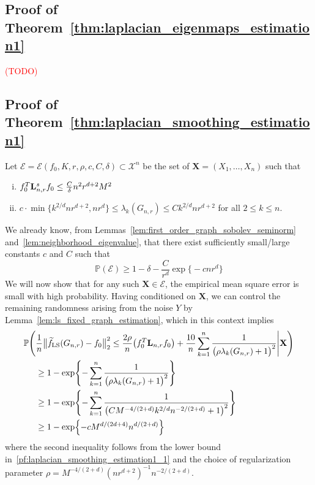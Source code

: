 \documentclass{article}
\newcommand{\1}{\mathbf{1}}
\newcommand{\Lap}{{\bf L}}
\newcommand{\mc}[1]{\mathcal{#1}}
\newcommand{\Pbb}{\mathbb{P}}
\newcommand{\wt}[1]{\widetilde{#1}}
\newcommand{\LS}{\mathrm{LS}}
\theoremstyle{alden}
\theoremstyle{aldenthm}
\theoremstyle{definition}
\theoremstyle{remark}
\begin{document}
\subsection{Proof of Theorem~\ref{thm:laplacian_eigenmaps_estimation1}}
\label{subsec:laplacian_eigenmaps_estimation1_pf}

\textcolor{red}{(TODO)}

\subsection{Proof of Theorem~\ref{thm:laplacian_smoothing_estimation1}}
\label{subsec:laplacian_smoothing_estimation1_pf}
Let $\mc{E} = \mc{E}(f_0, K,r,\rho,c,C,\delta) \subset \mc{X}^n$ be the set of $\mathbf{X} = (X_1,\ldots,X_n)$ such that
\begin{enumerate}[(i)]
	\item
	\label{pf:laplacian_smoothing_estimation1_0}
	 $f_0^T \Lap_{n,r}^s f_0 \leq \frac{C}{\delta} n^2 r^{d + 2}M^2$
	\item 
	\label{pf:laplacian_smoothing_estimation1_1}
	$c \cdot \min\{k^{2/d}nr^{d+2},nr^d\} \leq \lambda_k(G_{n,r}) \leq Ck^{2/d}nr^{d + 2} $ for all $2 \leq k \leq n$.
\end{enumerate}
We already know, from Lemmas~\ref{lem:first_order_graph_sobolev_seminorm} and~\ref{lem:neighborhood_eigenvalue}, that there exist sufficiently small/large constants $c$ and $C$ such that
\begin{equation}
\label{pf:laplacian_smoothing_estimation1_1.5}
\Pbb(\mc{E}) \geq 1 - \delta - \frac{C}{r^d}\exp\bigl\{-cnr^d\bigr\}
\end{equation}
We will now show that for any such $\mathbf{X} \in \mc{E}$, the empirical mean square error is small with high probability. Having conditioned on $\mathbf{X}$, we can control the remaining randomness arising from the noise $Y$ by Lemma~\ref{lem:ls_fixed_graph_estimation}, which in this context implies
\begin{equation}
\label{pf:laplacian_smoothing_estimation1_2}
\begin{aligned}
\Pbb\Biggl(& \frac{1}{n}\bigl\|\wt{f}_{\LS}(G_{n,r}) - f_0\bigr\|_2^2 \leq \frac{2\rho}{n} \bigl(f_0^T \Lap_{n,r} f_0\bigr) + \frac{10}{n}\sum_{k = 1}^{n} \frac{1}{\bigl(\rho \lambda_{k}(G_{n,r}) + 1\bigr)^2} \Bigg| \mathbf{X}\Biggr) \\
& \geq 1 - \exp\Biggl\{-\sum_{k = 1}^{n}\frac{1}{\bigl(\rho \lambda_k(G_{n,r}) + 1\bigr)^2}\Biggr\} \\
& \geq 1 - \exp\Biggl\{-\sum_{k = 1}^{n}\frac{1}{\bigl(CM^{-4/(2+d)}k^{2/d}n^{-2/(2+d)} + 1\bigr)^2}\Biggr\} \\
& \geq 1 - \exp\Bigl\{-c M^{d/(2d + 4)} n^{d/(2+d)}\Bigr\}
\end{aligned}
\end{equation}
where the second inequality follows from the lower bound in~\ref{pf:laplacian_smoothing_estimation1_1} and the choice of regularization parameter $\rho = M^{-4/(2+d)}(nr^{d+2})^{-1}n^{-2/(2+d)}$. 
\end{document}
